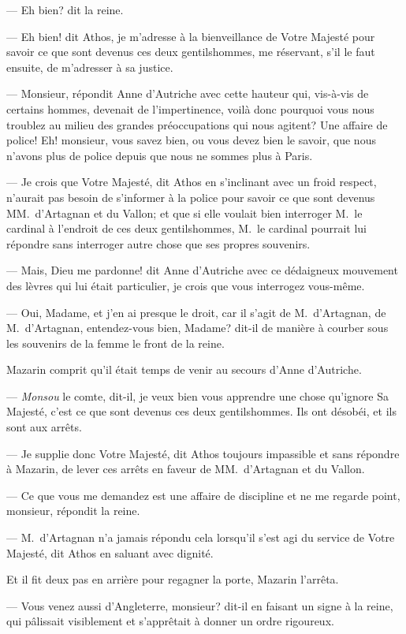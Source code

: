 — Eh bien? dit la reine.

— Eh bien! dit Athos, je m'adresse à la bienveillance de Votre Majesté pour savoir ce que sont devenus ces deux gentilshommes, me réservant, s'il le faut ensuite, de m'adresser à sa justice.

— Monsieur, répondit Anne d'Autriche avec cette hauteur qui, vis-à-vis de certains hommes, devenait de l'impertinence, voilà donc pourquoi vous nous troublez au milieu des grandes préoccupations qui nous agitent? Une affaire de police! Eh! monsieur, vous savez bien, ou vous devez bien le savoir, que nous n'avons plus de police depuis que nous ne sommes plus à Paris.

— Je crois que Votre Majesté, dit Athos en s'inclinant avec un froid respect, n'aurait pas besoin de s'informer à la police pour savoir ce que sont devenus MM.~d'Artagnan et du Vallon; et que si elle voulait bien interroger M.~le cardinal à l'endroit de ces deux gentilshommes, M.~le cardinal pourrait lui répondre sans interroger autre chose que ses propres souvenirs.

— Mais, Dieu me pardonne! dit Anne d'Autriche avec ce dédaigneux mouvement des lèvres qui lui était particulier, je crois que vous interrogez vous-même.

— Oui, Madame, et j'en ai presque le droit, car il s'agit de M.~d'Artagnan, de M.~d'Artagnan, entendez-vous bien, Madame? dit-il de manière à courber sous les souvenirs de la femme le front de la reine.

Mazarin comprit qu'il était temps de venir au secours d'Anne d'Autriche.

— \textit{Monsou} le comte, dit-il, je veux bien vous apprendre une chose qu'ignore Sa Majesté, c'est ce que sont devenus ces deux gentilshommes. Ils ont désobéi, et ils sont aux arrêts.

— Je supplie donc Votre Majesté, dit Athos toujours impassible et sans répondre à Mazarin, de lever ces arrêts en faveur de MM.~d'Artagnan et du Vallon.

— Ce que vous me demandez est une affaire de discipline et ne me regarde point, monsieur, répondit la reine.

— M.~d'Artagnan n'a jamais répondu cela lorsqu'il s'est agi du service de Votre Majesté, dit Athos en saluant avec dignité.

Et il fit deux pas en arrière pour regagner la porte, Mazarin l'arrêta.

— Vous venez aussi d'Angleterre, monsieur? dit-il en faisant un signe à la reine, qui pâlissait visiblement et s'apprêtait à donner un ordre rigoureux.

